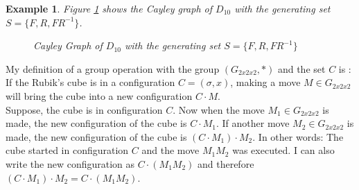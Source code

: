 \documentclass[12pt,a4paper]{article}
\theoremstyle{custom}
\newtheorem*{example}{Example}
\begin{document}
\begin{example}
Figure \ref{fig:D10} shows the Cayley graph of $D_{10}$ with the generating set $S= \{F, R, FR^{-1}\}$. 

 \begin{figure}[H]
\centering
    \caption{Cayley Graph of $D_{10}$ with the generating set $S= \{F, R, FR^{-1}\}$}
    \label{fig:D10}
\end{figure}

\end{example}


My definition of a group operation with the group $(G_{2x2x2}, \scriptstyle * )$ and the set $C$ is : \\
If the Rubik's cube is in a configuration $C=(\sigma, x)$, making a move $M \in G_{2x2x2}$ will bring the cube into a new configuration  $C \cdot M$. 
\\
Suppose, the cube is in configuration $C$. Now when the move $M_1 \in G_{2x2x2}$ is made, the new configuration of the cube is $C \cdot M_1$. If another move $M_2 \in G_{2x2x2}$ is made, the new configuration of the cube is $(C \cdot M_1) \cdot M_2$. 
In other words: The cube started in configuration $C$ and the move $M_1 M_2$ was executed. I can also write the new configuration as $C \cdot (M_1 M_2)$ and therefore $(C \cdot M_1) \cdot M_2 = C \cdot (M_1 M_2)$. 
\end{document}
